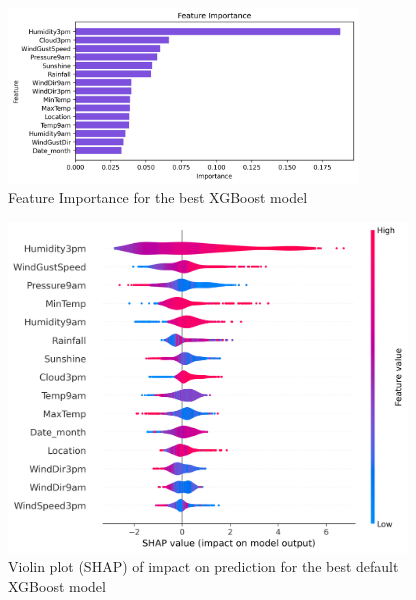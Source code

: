 \documentclass{article}%
\begin{document}
%


\begin{figure}[h!]%
\centering%
\includegraphics[width=350px]{XAI/XGBoost/feature_importance.png}%
\caption{Feature Importance for the best XGBoost model}%
\end{figure}

%


\begin{figure}[h!]%
\centering%
\includegraphics[width=400px]{XAI/XGBoost/violin_summary_plot_shap.png}%
\caption{Violin plot (SHAP) of impact on prediction for the best default XGBoost model}%
\end{figure}

%
\end{document}
